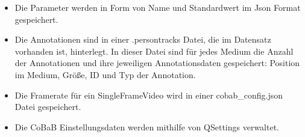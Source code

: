 \begin{itemize}
\item Die Parameter werden in Form von Name und Standardwert im Json Format gespeichert.
\item Die Annotationen sind in einer .persontracks Datei, die im Datensatz vorhanden ist, hinterlegt. In dieser Datei sind für jedes Medium die Anzahl der Annotationen und ihre jeweiligen Annotationsdaten gespeichert: Position im Medium, Größe, ID und Typ der Annotation.
\item Die Framerate für ein SingleFrameVideo wird in einer cobab\_config.json Datei gespeichert.
\item Die CoBaB Einstellungsdaten werden mithilfe von QSettings verwaltet.
\end{itemize}